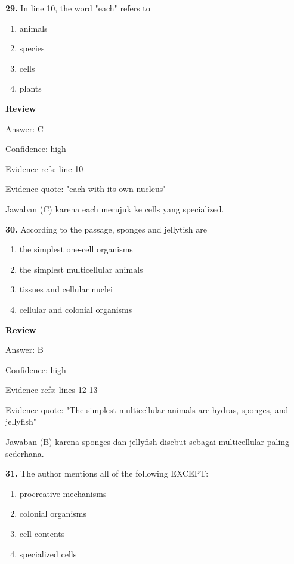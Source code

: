 \documentclass[12pt]{article}
\begin{document}
\endgroup
\par
\vspace{0.25\baselineskip}
\noindent\textbf{29.} In line 10, the word "each" refers to
\begin{enumerate}[label=(\Alph*),leftmargin=*,itemsep=0.2em]
\item animals
\item species
\item cells
\item plants
\end{enumerate}
\par
\begingroup
\setlength{\parskip}{0pt}
\setlength{\parindent}{0pt}
\textbf{Review}\par
Answer: C\par
Confidence: high\par
Evidence refs: line 10\par
Evidence quote: "each with its own nucleus"\par
Jawaban (C) karena each merujuk ke cells yang specialized.\par
\endgroup
\par
\vspace{0.25\baselineskip}
\noindent\textbf{30.} According to the passage, sponges and jellytish are
\begin{enumerate}[label=(\Alph*),leftmargin=*,itemsep=0.2em]
\item the simplest one-cell organisms
\item the simplest multicellular animals
\item tissues and cellular nuclei
\item cellular and colonial organisms
\end{enumerate}
\par
\begingroup
\setlength{\parskip}{0pt}
\setlength{\parindent}{0pt}
\textbf{Review}\par
Answer: B\par
Confidence: high\par
Evidence refs: lines 12-13\par
Evidence quote: "The simplest multicellular animals are hydras, sponges, and jellyfish"\par
Jawaban (B) karena sponges dan jellyfish disebut sebagai multicellular paling sederhana.\par
\endgroup
\par
\vspace{0.25\baselineskip}
\noindent\textbf{31.} The author mentions all of the following EXCEPT:
\begin{enumerate}[label=(\Alph*),leftmargin=*,itemsep=0.2em]
\item procreative mechanisms
\item colonial organisms
\item cell contents
\item specialized cells
\end{enumerate}
\end{document}

